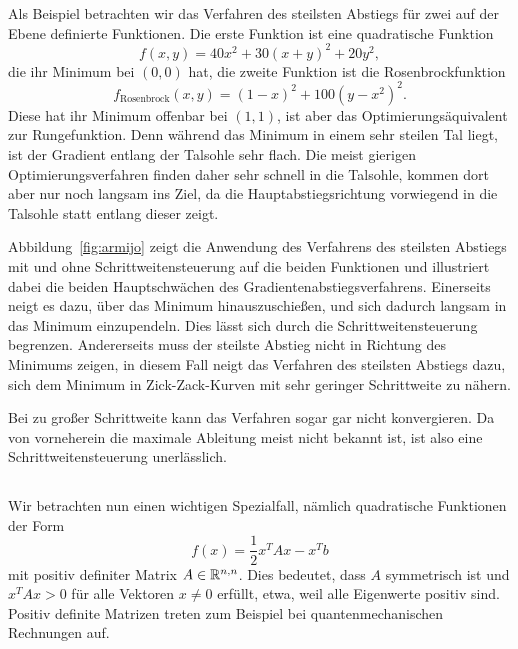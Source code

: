%
Als Beispiel betrachten wir das Verfahren des steilsten Abstiegs für
zwei auf der Ebene definierte Funktionen. Die erste Funktion ist eine
quadratische Funktion
\begin{equation}
  \label{eq:quadgl}
  f(x, y) = 40 x^2 + 30(x + y)^2 + 20 y^2,
\end{equation}
die ihr Minimum bei $(0,0)$ hat, die zweite Funktion ist die
Rosenbrockfunktion
\begin{equation}
  f_{\text{Rosenbrock}}(x, y) = (1-x)^2 + 100(y-x^2)^2.
\end{equation}
Diese hat ihr Minimum offenbar bei $(1,1)$, ist aber das
Optimierungsäquivalent zur Rungefunktion. Denn während das Minimum in
einem sehr steilen Tal liegt, ist der Gradient entlang der Talsohle
sehr flach. Die meist gierigen Optimierungsverfahren finden daher sehr
schnell in die Talsohle, kommen dort aber nur noch langsam ins Ziel,
da die Hauptabstiegsrichtung vorwiegend in die Talsohle statt
entlang dieser zeigt.

Abbildung~\ref{fig:armijo} zeigt die Anwendung des Verfahrens des
steilsten Abstiegs mit und ohne Schrittweitensteuerung auf die beiden
Funktionen und illustriert dabei die beiden Hauptschwächen des
Gradientenabstiegsverfahrens. Einerseits neigt es dazu, über das
Minimum hinauszuschießen, und sich dadurch langsam in das Minimum
einzupendeln. Dies lässt sich durch die Schrittweitensteuerung
begrenzen. Andererseits muss der steilste Abstieg nicht in Richtung
des Minimums zeigen, in diesem Fall neigt das Verfahren des steilsten
Abstiegs dazu, sich dem Minimum in Zick-Zack-Kurven mit sehr geringer
Schrittweite zu nähern.

Bei zu großer Schrittweite kann das Verfahren sogar gar nicht
konvergieren. Da von vorneherein die maximale Ableitung meist nicht
bekannt ist, ist also eine Schrittweitensteuerung unerlässlich.

\subsection{}

Wir betrachten nun einen wichtigen Spezialfall, nämlich quadratische
Funktionen der Form
\begin{equation}
  \label{eq:cgfunktion}
  f(x) = \frac{1}{2}x^TAx - x^Tb
\end{equation}
mit positiv definiter Matrix $A\in\mathbb{R}^{n,n}$.  Dies bedeutet, dass $A$
symmetrisch ist und $x^TAx>0$ für alle Vektoren $x\neq 0$ erfüllt,
etwa, weil alle Eigenwerte positiv sind.  Positiv definite Matrizen
treten zum Beispiel bei quantenmechanischen Rechnungen auf.

